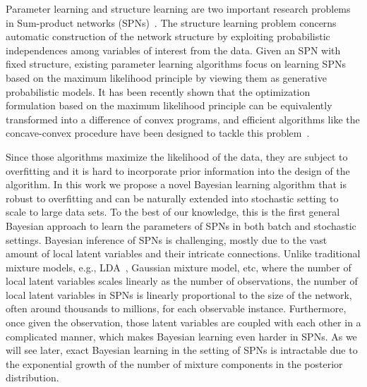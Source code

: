 \documentclass{article} %
\theoremstyle{definition}
\begin{document}
Parameter learning and structure learning are two important research problems in Sum-product networks (SPNs)~\cite{gens2013learning,zhao2015unifying,gens2012discriminative}. The structure learning problem concerns automatic construction of the network structure by exploiting probabilistic independences among variables of interest from the data. Given an SPN with fixed structure, existing parameter learning algorithms focus on learning SPNs based on the maximum likelihood principle by viewing them as generative probabilistic models. It has been recently shown that the optimization formulation based on the maximum likelihood principle can be equivalently transformed into a difference of convex programs, and efficient algorithms like the concave-convex procedure have been designed to tackle this problem~\cite{zhao2015unifying}. 

Since those algorithms maximize the likelihood of the data, they are subject to overfitting and it is hard to incorporate prior information into the design of the algorithm. In this work we propose a novel Bayesian learning algorithm that is robust to overfitting and can be naturally extended into stochastic setting to scale to large data sets. To the best of our knowledge, this is the first general Bayesian approach to learn the parameters of SPNs in both batch and stochastic settings. Bayesian inference of SPNs is challenging, mostly due to the vast amount of local latent variables and their intricate connections. Unlike traditional mixture models, e.g., LDA~\cite{blei2003latent}, Gaussian mixture model, etc, where the number of local latent variables scales linearly as the number of observations, the number of local latent variables in SPNs is linearly proportional to the size of the network, often around thousands to millions, for each observable instance. Furthermore, once given the observation, those latent variables are coupled with each other in a complicated manner, which makes Bayesian learning even harder in SPNs. As we will see later, exact Bayesian learning in the setting of SPNs is intractable due to the exponential growth of the number of mixture components in the posterior distribution.
\end{document}
